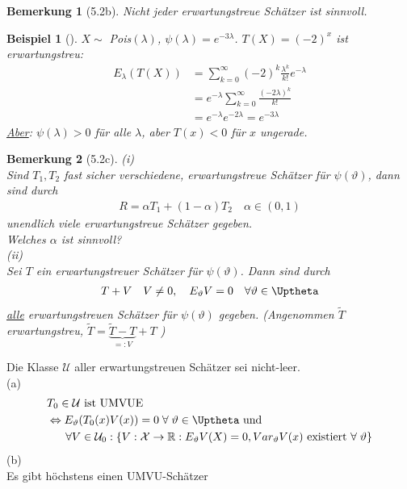 \documentclass[a4paper,openany]{book}
\theoremstyle{mytheoremstyle}
\newtheorem*{bei}{Beispiel}
\newtheorem*{bem}{Bemerkung}
\theoremstyle{mytheoremstyle2}
\begin{document}
\begin{bem}[5.2b]
  Nicht jeder erwartungstreue Schätzer ist sinnvoll.
\end{bem}
\begin{bei}[]
  $X\sim$ Pois$(\lambda )$, $\psi (\lambda )=e^{-3 \lambda }$. $T(X)=(-2)^x$ ist erwartungstreu:
  \begin{align*}
    E _{\lambda }(T(X))
    &=\sum_{k=0}^{\infty }{(-2)^k \frac{\lambda ^k}{k!}e^{- \lambda }} \\
    &=e^{-\lambda }\sum_{k=0}^{\infty}{\frac{(-2 \lambda )^k}{k!}} \\
    &=e^{-\lambda }e^{-2 \lambda }=e^{-3 \lambda }
  \end{align*}
  \underline{Aber}: $\psi (\lambda )>0$ für alle $\lambda $, aber $T(x)<0$ für $x$ ungerade.   
\end{bei}
\begin{bem}[5.2c]
  (i)\\
  Sind $T_1,T_2$ fast sicher verschiedene, erwartungstreue Schätzer für $\psi (\vartheta )$, dann sind durch 
  \begin{align*}
    R=\alpha T_1+(1-\alpha )T_2\quad \alpha \in (0,1)
  \end{align*}
  unendlich viele erwartungstreue Schätzer gegeben. \\
  Welches $\alpha $ ist sinnvoll? \\
  (ii)\\
  Sei $T$ ein erwartungstreuer Schätzer für $\psi (\vartheta )$. Dann sind durch
  \begin{align*}
    T+V\quad V \neq 0,\quad E _{\vartheta }V=0\quad \forall \vartheta \in \Uptheta
  \end{align*}
  \underline{alle} erwartungstreuen Schätzer für $\psi (\vartheta )$ gegeben.
  (Angenommen $\tilde{T}$ erwartungstreu, $\tilde{T}=\underbrace{\tilde{T}-T}_{=:V}+T$ )
\end{bem}
\begin{theo}{5.3}{}
  Die Klasse $\mathcal{U}$ aller erwartungstreuen Schätzer sei nicht-leer. \\
  (a)  
  \begin{align*}
    &T_0 \in \mathcal{U}\text{ ist UMVUE }\\
    &\Leftrightarrow E _{\vartheta }(T_0(x)V(x))=0 \;\forall\;\vartheta \in \Uptheta\text{ und }\\
    &\ \ \quad\forall V \in \mathcal{U}_0:\left\{V:\mathcal{X}\to \mathbb{R}:E _{\vartheta }V(X)=0, Var _{\vartheta } V(x)\text{ existiert }\forall\;\vartheta\right\}
  \end{align*}
  (b) \\
  Es gibt höchstens einen UMVU-Schätzer
\end{theo}
\end{document}
